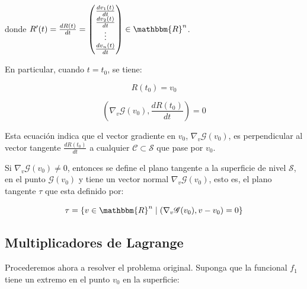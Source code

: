                 donde $R'(t) = \frac{dR(t)}{dt} = \begin{pmatrix} \frac{d v_1(t)}{dt} \\ \frac{d v_2(t)}{dt} \\ \vdots \\ \frac{d v_n(t)}{dt} \end{pmatrix} \in \mathbbm{R}^n$.

                En particular, cuando $t = t_0$, se tiene:

                \begin{equation*}
                    R(t_0) = v_0
                \end{equation*}

                \begin{equation*}
                    \left( \nabla_v \mathscr{G}(v_0), \frac{dR(t_0)}{dt} \right) = 0
                \end{equation*}

                Esta ecuación indica que el vector gradiente en $v_0$, $\nabla_v \mathscr{G}(v_0)$,  es perpendicular al vector tangente $\frac{dR(t_0)}{dt}$ a cualquier $\mathscr{C} \subset \mathscr{S}$ que pase por $v_0$.



                Si $\nabla_v \mathscr{G}(v_0) \ne 0$, entonces se define el plano tangente a la superficie de nivel $\mathscr{S}$, en el punto $\mathscr{G}(v_0)$ y tiene un vector normal $\nabla_v \mathscr{G}(v_0)$, esto es, el plano tangente $\tau$ que esta definido por:

                \begin{equation}
                    \tau = \left\{ v \in \mathbbm{R}^n \mid \left( \nabla_v \mathscr{G}(v_0), v - v_0 \right) = 0 \right\}
                \end{equation}


        \subsection{Multiplicadores de Lagrange}

            Procederemos ahora a resolver el problema original. Suponga que la funcional $f_1$ tiene un extremo en el punto $v_0$ en la superficie:

